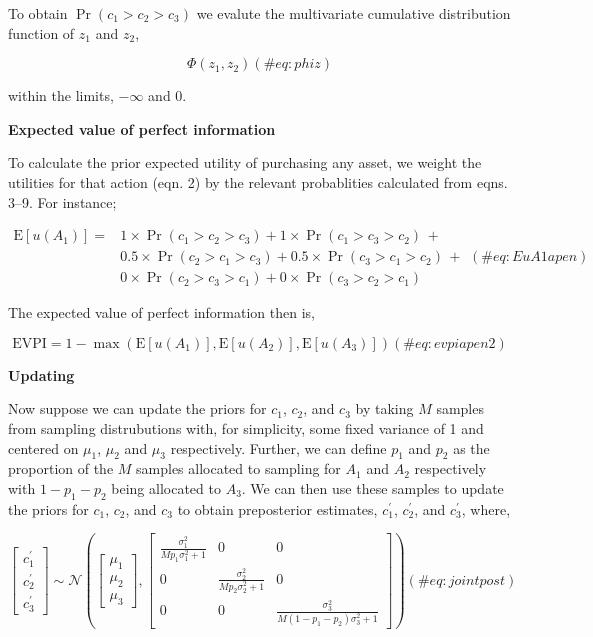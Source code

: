 To obtain \(\Pr(c_1 > c_2 > c_3)\) we evalute the multivariate
cumulative distribution function of \(z_1\) and \(z_2\),

\begin{equation}
\Phi(z_1,z_2)
(\#eq:phiz)
\end{equation}

within the limits, \(-\infty\) and 0.

\textbf{Expected value of perfect information}

To calculate the prior expected utility of purchasing any asset, we
weight the utilities for that action (eqn. 2) by the relevant
probablities calculated from eqns. 3--9. For instance;

\begin{equation}
\begin{aligned}
  \mathrm{E}[u(A_1)] = & 1 \times \Pr(c_1 > c_2 > c_3) + 1 \times \Pr(c_1 > c_3 > c_2)\,+ \\
  &0.5 \times \Pr(c_2 > c_1 > c_3) + 0.5 \times \Pr(c_3 > c_1 > c_2)\,+ \\
  &0 \times \Pr(c_2 > c_3 > c_1) + 0 \times \Pr(c_3 > c_2 > c_1)
\end{aligned}
(\#eq:EuA1apen)
\end{equation}

The expected value of perfect information then is,

\begin{equation}
\mathrm{EVPI}=1-\max(\mathrm{E}[u(A_1)],\mathrm{E}[u(A_2)],\mathrm{E}[u(A_3)])
(\#eq:evpiapen2)
\end{equation}

\textbf{Updating}

Now suppose we can update the priors for \(c_1\), \(c_2\), and \(c_3\)
by taking \(M\) samples from sampling distrubutions with, for
simplicity, some fixed variance of 1 and centered on \(\mu_1\),
\(\mu_2\) and \(\mu_3\) respectively. Further, we can define \(p_1\) and
\(p_2\) as the proportion of the \(M\) samples allocated to sampling for
\(A_1\) and \(A_2\) respectively with \(1 - p_1 - p_2\) being allocated
to \(A_3\). We can then use these samples to update the priors for
\(c_1\), \(c_2\), and \(c_3\) to obtain preposterior estimates,
\(c^\prime_1\), \(c^\prime_2\), and \(c^\prime_3\), where,

\begin{equation}
\begin{bmatrix}c^\prime_1 \\ c^\prime_2 \\ c^\prime_3\end{bmatrix}\sim\mathcal{N}\left(\begin{bmatrix}\mu_1 \\ \mu_2 \\ \mu_3\end{bmatrix}, \begin{bmatrix}\frac{\sigma^2_1}{Mp_1\sigma^2_1 + 1} & 0 & 0 \\ 0 & \frac{\sigma^2_2}{Mp_2\sigma^2_2 + 1} & 0\\ 0 & 0 & \frac{\sigma^2_3}{M(1 - p_1 - p_2)\sigma^2_3 + 1} \end{bmatrix}\right)
(\#eq:jointpost)
\end{equation}

